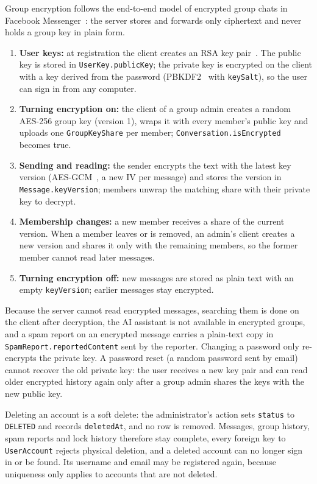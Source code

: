 Group encryption follows the end-to-end model of encrypted group chats in
Facebook Messenger~\cite{ref:messenger-e2ee}: the server stores and forwards only ciphertext and never
holds a group key in plain form.

\begin{enumerate}
  \item \textbf{User keys:} at registration the client creates an RSA key pair~\cite{ref:rfc8017}.
    The public key is stored in \texttt{UserKey.publicKey}; the private key is
    encrypted on the client with a key derived from the password (PBKDF2~\cite{ref:rfc8018} with
    \texttt{keySalt}), so the user can sign in from any computer.
  \item \textbf{Turning encryption on:} the client of a group admin creates a
    random AES-256 group key (version 1), wraps it with every member's public key
    and uploads one \texttt{GroupKeyShare} per member;
    \texttt{Conversation.isEncrypted} becomes true.
  \item \textbf{Sending and reading:} the sender encrypts the text with the latest
    key version (AES-GCM~\cite{ref:nist-gcm}, a new IV per message) and stores the version in
    \texttt{Message.keyVersion}; members unwrap the matching share with their
    private key to decrypt.
  \item \textbf{Membership changes:} a new member receives a share of the current
    version. When a member leaves or is removed, an admin's client creates a new
    version and shares it only with the remaining members, so the former member
    cannot read later messages.
  \item \textbf{Turning encryption off:} new messages are stored as plain text with
    an empty \texttt{keyVersion}; earlier messages stay encrypted.
\end{enumerate}

Because the server cannot read encrypted messages, searching them is done on the
client after decryption, the AI assistant is not available in encrypted groups,
and a spam report on an encrypted message carries a plain-text copy in
\texttt{SpamReport.reportedContent} sent by the reporter. Changing a password only
re-encrypts the private key. A password reset (a random password sent by email)
cannot recover the old private key: the user receives a new key pair and can read
older encrypted history again only after a group admin shares the keys with the
new public key.

Deleting an account is a soft delete: the administrator's action sets
\texttt{status} to \texttt{DELETED} and records \texttt{deletedAt}, and no row is
removed. Messages, group history, spam reports and lock history therefore stay
complete, every foreign key to \texttt{UserAccount} rejects physical deletion, and a
deleted account can no longer sign in or be found. Its username and email may be
registered again, because uniqueness only applies to accounts that are not deleted.

